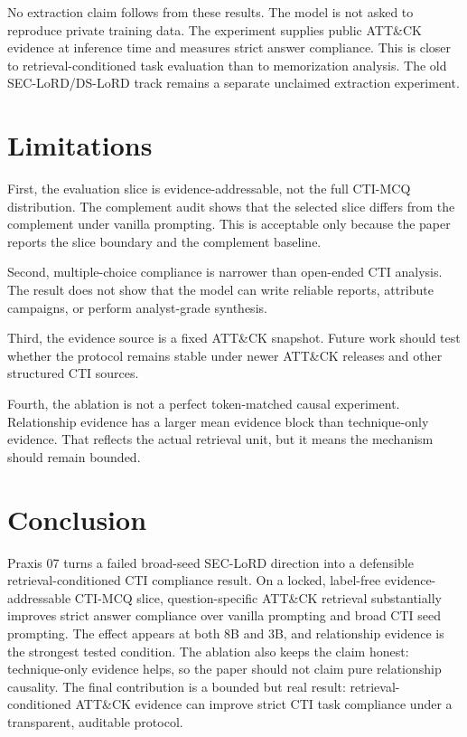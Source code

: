 \documentclass[10pt]{article}
\begin{document}
No extraction claim follows from these results.
The model is not asked to reproduce private training data.
The experiment supplies public ATT\&CK evidence at inference time and measures strict answer compliance.
This is closer to retrieval-conditioned task evaluation than to memorization analysis.
The old SEC-LoRD/DS-LoRD track remains a separate unclaimed extraction experiment.

\section{Limitations}

First, the evaluation slice is evidence-addressable, not the full CTI-MCQ distribution.
The complement audit shows that the selected slice differs from the complement under vanilla prompting.
This is acceptable only because the paper reports the slice boundary and the complement baseline.

Second, multiple-choice compliance is narrower than open-ended CTI analysis.
The result does not show that the model can write reliable reports, attribute campaigns, or perform analyst-grade synthesis.

Third, the evidence source is a fixed ATT\&CK snapshot.
Future work should test whether the protocol remains stable under newer ATT\&CK releases and other structured CTI sources.

Fourth, the ablation is not a perfect token-matched causal experiment.
Relationship evidence has a larger mean evidence block than technique-only evidence.
That reflects the actual retrieval unit, but it means the mechanism should remain bounded.

\section{Conclusion}

Praxis 07 turns a failed broad-seed SEC-LoRD direction into a defensible retrieval-conditioned CTI compliance result.
On a locked, label-free evidence-addressable CTI-MCQ slice, question-specific ATT\&CK retrieval substantially improves strict answer compliance over vanilla prompting and broad CTI seed prompting.
The effect appears at both 8B and 3B, and relationship evidence is the strongest tested condition.
The ablation also keeps the claim honest: technique-only evidence helps, so the paper should not claim pure relationship causality.
The final contribution is a bounded but real result: retrieval-conditioned ATT\&CK evidence can improve strict CTI task compliance under a transparent, auditable protocol.

\FloatBarrier

\ifdefined\praxiswrapper
\else


\end{document}
